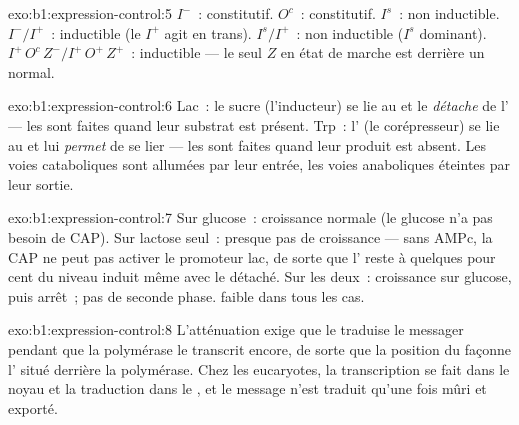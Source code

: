 \begin{solution}{exo:b1:expression-control:5}
$I^-$~: constitutif. $O^c$~: constitutif. $I^s$~: non inductible.
$I^-/I^+$~: inductible (le  $I^+$ agit en trans). $I^s/I^+$~:
non inductible ($I^s$ dominant). $I^+\,O^c\,Z^- / I^+\,O^+\,Z^+$~:
inductible --- le seul $Z$ en état de marche est derrière un 
normal.
\end{solution}

\begin{solution}{exo:b1:expression-control:6}
Lac~: le sucre (l'inducteur) se lie au  et le \emph{détache}
de l' --- les  sont faites quand leur substrat est
présent. Trp~: l' (le corépresseur) se lie au  et
lui \emph{permet} de se lier --- les  sont faites quand leur
produit est absent. Les voies cataboliques sont allumées par leur
entrée, les voies anaboliques éteintes par leur sortie.
\end{solution}

\begin{solution}{exo:b1:expression-control:7}
Sur glucose~: croissance normale (le glucose n'a pas besoin de CAP). Sur
lactose seul~: presque pas de croissance --- sans AMPc, la CAP ne peut
pas activer le promoteur lac, de sorte que l' reste à quelques
pour cent du niveau induit même avec le  détaché. Sur les
deux~: croissance sur glucose, puis arrêt~; pas de seconde phase. 
faible dans tous les cas.
\end{solution}

\begin{solution}{exo:b1:expression-control:8}
L'atténuation exige que le  traduise le messager pendant que la
polymérase le transcrit encore, de sorte que la position du 
façonne l' situé derrière la polymérase. Chez les eucaryotes, la
transcription se fait dans le noyau et la traduction dans le , et
le message n'est traduit qu'une fois mûri et exporté.
\end{solution}

